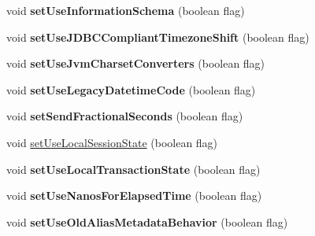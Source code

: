 \begin{DoxyCompactItemize}
void {\bfseries set\+Use\+Information\+Schema} (boolean flag)
\item 
\mbox{\label{classcom_1_1mysql_1_1jdbc_1_1_multi_host_my_s_q_l_connection_a6e7dd4491d32369ab211c9044f7971f5}} 
void {\bfseries set\+Use\+J\+D\+B\+C\+Compliant\+Timezone\+Shift} (boolean flag)
\item 
\mbox{\label{classcom_1_1mysql_1_1jdbc_1_1_multi_host_my_s_q_l_connection_a42c74954130e5276a50f4d91550b8d51}} 
void {\bfseries set\+Use\+Jvm\+Charset\+Converters} (boolean flag)
\item 
\mbox{\label{classcom_1_1mysql_1_1jdbc_1_1_multi_host_my_s_q_l_connection_aa4ef449bc534fad0535fbaab0cc5f5a4}} 
void {\bfseries set\+Use\+Legacy\+Datetime\+Code} (boolean flag)
\item 
\mbox{\label{classcom_1_1mysql_1_1jdbc_1_1_multi_host_my_s_q_l_connection_aa39180e744c611f11d4b97c548824c38}} 
void {\bfseries set\+Send\+Fractional\+Seconds} (boolean flag)
\item 
void \mbox{\hyperlink{classcom_1_1mysql_1_1jdbc_1_1_multi_host_my_s_q_l_connection_a9c5be4608718622501934b5054995bf7}{set\+Use\+Local\+Session\+State}} (boolean flag)
\item 
\mbox{\label{classcom_1_1mysql_1_1jdbc_1_1_multi_host_my_s_q_l_connection_a0090a3f3d8fdc6a65ae423b79a661f3a}} 
void {\bfseries set\+Use\+Local\+Transaction\+State} (boolean flag)
\item 
\mbox{\label{classcom_1_1mysql_1_1jdbc_1_1_multi_host_my_s_q_l_connection_aa0df306d0d9b9280cf59657f477efe95}} 
void {\bfseries set\+Use\+Nanos\+For\+Elapsed\+Time} (boolean flag)
\item 
\mbox{\label{classcom_1_1mysql_1_1jdbc_1_1_multi_host_my_s_q_l_connection_abafe9c3289543d5d757adc8817283f30}} 
void {\bfseries set\+Use\+Old\+Alias\+Metadata\+Behavior} (boolean flag)

\end{DoxyCompactItemize}
